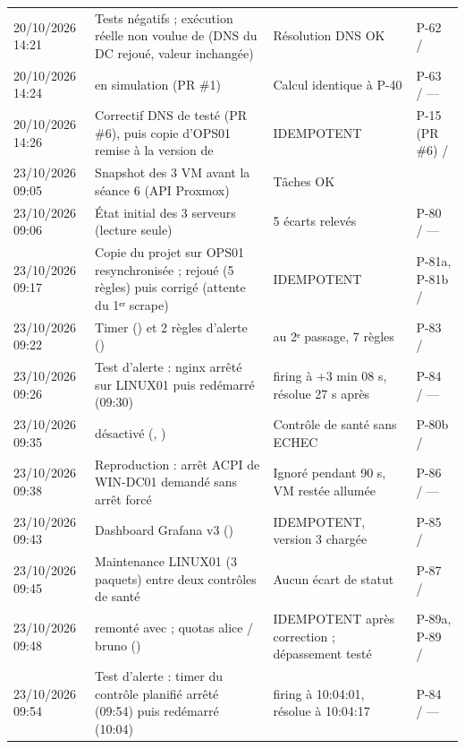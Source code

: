 \begin{longtable}{@{}P{2cm}P{6.3cm}P{3.4cm}P{2.6cm}@{}}
20/10/2026 14:21 & Tests négatifs ; exécution réelle non voulue de  (DNS du DC rejoué, valeur inchangée) & Résolution DNS OK & {\small P-62 / } \\
20/10/2026 14:24 &  en simulation (PR \#1) & Calcul identique à P-40 & {\small P-63 / —} \\
20/10/2026 14:26 & Correctif DNS de  testé (PR \#6), puis copie d'OPS01 remise à la version de  & IDEMPOTENT & {\small P-15 (PR \#6) / } \\
23/10/2026 09:05 & Snapshot des 3 VM avant la séance 6 (API Proxmox) & Tâches  OK & {\small {}} \\
23/10/2026 09:06 & État initial des 3 serveurs (lecture seule) & 5 écarts relevés & {\small P-80 / —} \\
23/10/2026 09:17 & Copie du projet sur OPS01 resynchronisée ;  rejoué (5 règles) puis corrigé (attente du 1ᵉʳ scrape) & IDEMPOTENT & {\small P-81a, P-81b / } \\
23/10/2026 09:22 & Timer  () et 2 règles d'alerte () &  au 2ᵉ passage, 7 règles & {\small P-83 / } \\
23/10/2026 09:26 & Test d'alerte : nginx arrêté sur LINUX01 puis redémarré (09:30) & firing à +3 min 08 s, résolue 27 s après & {\small P-84 / —} \\
23/10/2026 09:35 &  désactivé (, ) & Contrôle de santé sans ECHEC & {\small P-80b / } \\
23/10/2026 09:38 & Reproduction : arrêt ACPI de WIN-DC01 demandé sans arrêt forcé & Ignoré pendant 90 s, VM restée allumée & {\small P-86 / —} \\
23/10/2026 09:43 & Dashboard Grafana v3 () & IDEMPOTENT, version 3 chargée & {\small P-85 / } \\
23/10/2026 09:45 & Maintenance LINUX01 (3 paquets) entre deux contrôles de santé & Aucun écart de statut & {\small P-87 / } \\
23/10/2026 09:48 &  remonté avec  ; quotas alice / bruno () & IDEMPOTENT après correction ; dépassement testé & {\small P-89a, P-89 / } \\
23/10/2026 09:54 & Test d'alerte : timer du contrôle planifié arrêté (09:54) puis redémarré (10:04) &  firing à 10:04:01, résolue à 10:04:17 & {\small P-84 / —} \\
\end{longtable}
